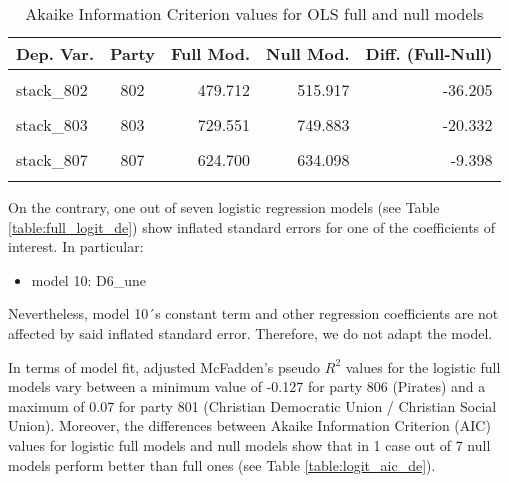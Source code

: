 \documentclass[
]{article}
\providecommand{\tightlist}{%
  \setlength{\itemsep}{0pt}\setlength{\parskip}{0pt}}
\begin{document}
\begin{table}[!h]

\caption{\label{tab:unnamed-chunk-73}Akaike Information Criterion values for OLS full and null models 
        \label{table:ols_aic_de}}
\centering
\begin{tabular}[t]{lcrrr}
\toprule
Dep. Var. & Party & Full Mod. & Null Mod. & Diff. (Full-Null)\\
\midrule
\cellcolor{gray!6}{stack\_801} & \cellcolor{gray!6}{801} & \cellcolor{gray!6}{631.253} & \cellcolor{gray!6}{723.798} & \cellcolor{gray!6}{-92.544}\\
stack\_802 & 802 & 479.712 & 515.917 & -36.205\\
\cellcolor{gray!6}{stack\_805} & \cellcolor{gray!6}{805} & \cellcolor{gray!6}{396.890} & \cellcolor{gray!6}{446.781} & \cellcolor{gray!6}{-49.891}\\
stack\_803 & 803 & 729.551 & 749.883 & -20.332\\
\cellcolor{gray!6}{stack\_804} & \cellcolor{gray!6}{804} & \cellcolor{gray!6}{562.799} & \cellcolor{gray!6}{597.527} & \cellcolor{gray!6}{-34.728}\\
\addlinespace
stack\_807 & 807 & 624.700 & 634.098 & -9.398\\
\cellcolor{gray!6}{stack\_806} & \cellcolor{gray!6}{806} & \cellcolor{gray!6}{68.843} & \cellcolor{gray!6}{178.350} & \cellcolor{gray!6}{-109.507}\\
\bottomrule
\end{tabular}
\end{table}

On the contrary, one out of seven logistic regression models (see Table \ref{table:full_logit_de}) show inflated standard errors for one of the coefficients of interest. In particular:

\begin{itemize}
\tightlist
\item
  model 10: D6\_une
\end{itemize}

Nevertheless, model 10´s constant term and other regression coefficients are not affected by said
inflated standard error. Therefore, we do not adapt the model.

In terms of model fit, adjusted McFadden's pseudo \(R^2\) values for the logistic full models vary between
a minimum value of
-0.127
for party 806
(Pirates)
and a maximum of
0.07
for party 801
(Christian Democratic Union / Christian Social Union).
Moreover, the differences between Akaike Information Criterion (AIC) values for logistic full models and
null models show that in 1 case out of 7 null models perform better than full ones (see Table
\ref{table:logit_aic_de}).
\end{document}
